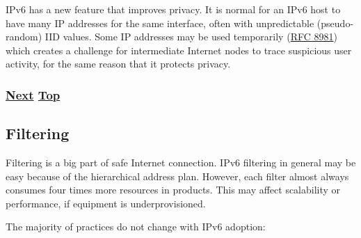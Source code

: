\documentclass[
]{article}
\begin{document}
IPv6 has a new feature that improves privacy. It is normal for an IPv6
host to have many IP addresses for the same interface, often with
unpredictable (pseudo-random) IID values. Some IP addresses may be used
temporarily (\href{https://www.rfc-editor.org/info/rfc8981}{RFC 8981})
which creates a challenge for intermediate Internet nodes to trace
suspicious user activity, for the same reason that it protects privacy.

\subsubsection{\texorpdfstring{\hyperref[filtering]{Next}
\hyperref[security]{Top}}{Next Top}}\label{next-top-3}

\pagebreak

\subsection{Filtering}\label{filtering}

Filtering is a big part of safe Internet connection. IPv6 filtering in
general may be easy because of the hierarchical address plan. However,
each filter almost always consumes four times more resources in
products. This may affect scalability or performance, if equipment is
underprovisioned.

The majority of practices do not change with IPv6 adoption:
\end{document}
